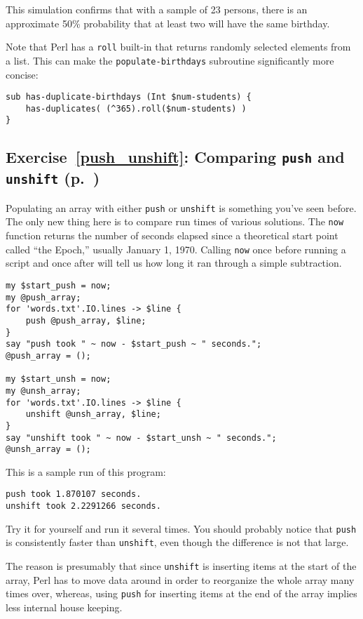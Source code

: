 This simulation confirms that with a sample of 23 persons, 
there is an approximate 50\% probability that at least 
two will have the same birthday.

Note that Perl has a {\tt roll} built-in that returns 
randomly selected elements from a list. This can make 
the {\tt populate-birthdays} subroutine significantly 
more concise:

\begin{verbatim}
sub has-duplicate-birthdays (Int $num-students) {
    has-duplicates( (^365).roll($num-students) )
}
\end{verbatim}

\subsection{Exercise~\ref{push_unshift}: Comparing {\tt push} and {\tt unshift} (p.~\pageref{push_unshift})}
\label{sol_push_unshift}

Populating an array with either {\tt push} or 
{\tt unshift} is something you've seen before. The only new thing 
here is to compare run times of various solutions.
The {\tt now} function returns the number of seconds 
elapsed since a theoretical start point called ``the 
Epoch,'' usually January 1, 1970. Calling {\tt now} once 
before running a script and once after will tell 
us how long it ran through a simple subtraction.

\begin{verbatim}
my $start_push = now;
my @push_array;
for 'words.txt'.IO.lines -> $line {
    push @push_array, $line;
}
say "push took " ~ now - $start_push ~ " seconds.";
@push_array = ();

my $start_unsh = now;
my @unsh_array;
for 'words.txt'.IO.lines -> $line {
    unshift @unsh_array, $line;
}
say "unshift took " ~ now - $start_unsh ~ " seconds.";
@unsh_array = ();
\end{verbatim}

This is a sample run of this program:
\begin{verbatim}
push took 1.870107 seconds.
unshift took 2.2291266 seconds.
\end{verbatim}

Try it for yourself and run it several times. You should 
probably notice that {\tt push} is consistently 
faster than {\tt unshift}, even though the difference 
is not that large.

The reason is presumably that since {\tt unshift} is 
inserting items at the start of the array, Perl has 
to move data around in order to reorganize the whole 
array many times over, whereas, using {\tt push} 
for inserting items at the end of the array implies 
less internal house keeping.

